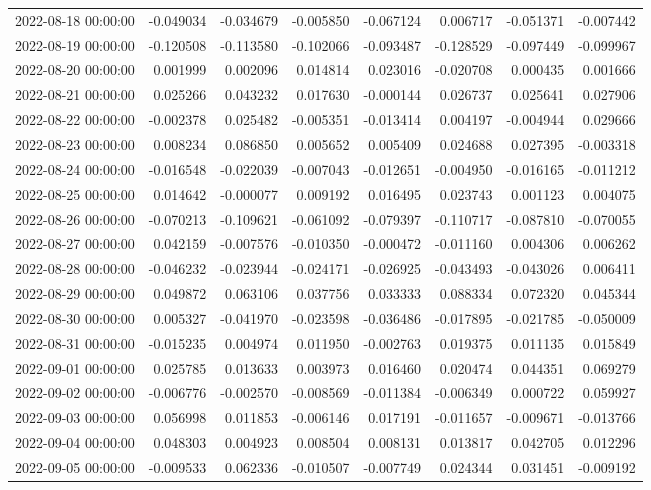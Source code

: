 \begin{tabular}{lrrrrrrr}
2022-08-18 00:00:00 & -0.049034 & -0.034679 & -0.005850 & -0.067124 & 0.006717 & -0.051371 & -0.007442 \\
2022-08-19 00:00:00 & -0.120508 & -0.113580 & -0.102066 & -0.093487 & -0.128529 & -0.097449 & -0.099967 \\
2022-08-20 00:00:00 & 0.001999 & 0.002096 & 0.014814 & 0.023016 & -0.020708 & 0.000435 & 0.001666 \\
2022-08-21 00:00:00 & 0.025266 & 0.043232 & 0.017630 & -0.000144 & 0.026737 & 0.025641 & 0.027906 \\
2022-08-22 00:00:00 & -0.002378 & 0.025482 & -0.005351 & -0.013414 & 0.004197 & -0.004944 & 0.029666 \\
2022-08-23 00:00:00 & 0.008234 & 0.086850 & 0.005652 & 0.005409 & 0.024688 & 0.027395 & -0.003318 \\
2022-08-24 00:00:00 & -0.016548 & -0.022039 & -0.007043 & -0.012651 & -0.004950 & -0.016165 & -0.011212 \\
2022-08-25 00:00:00 & 0.014642 & -0.000077 & 0.009192 & 0.016495 & 0.023743 & 0.001123 & 0.004075 \\
2022-08-26 00:00:00 & -0.070213 & -0.109621 & -0.061092 & -0.079397 & -0.110717 & -0.087810 & -0.070055 \\
2022-08-27 00:00:00 & 0.042159 & -0.007576 & -0.010350 & -0.000472 & -0.011160 & 0.004306 & 0.006262 \\
2022-08-28 00:00:00 & -0.046232 & -0.023944 & -0.024171 & -0.026925 & -0.043493 & -0.043026 & 0.006411 \\
2022-08-29 00:00:00 & 0.049872 & 0.063106 & 0.037756 & 0.033333 & 0.088334 & 0.072320 & 0.045344 \\
2022-08-30 00:00:00 & 0.005327 & -0.041970 & -0.023598 & -0.036486 & -0.017895 & -0.021785 & -0.050009 \\
2022-08-31 00:00:00 & -0.015235 & 0.004974 & 0.011950 & -0.002763 & 0.019375 & 0.011135 & 0.015849 \\
2022-09-01 00:00:00 & 0.025785 & 0.013633 & 0.003973 & 0.016460 & 0.020474 & 0.044351 & 0.069279 \\
2022-09-02 00:00:00 & -0.006776 & -0.002570 & -0.008569 & -0.011384 & -0.006349 & 0.000722 & 0.059927 \\
2022-09-03 00:00:00 & 0.056998 & 0.011853 & -0.006146 & 0.017191 & -0.011657 & -0.009671 & -0.013766 \\
2022-09-04 00:00:00 & 0.048303 & 0.004923 & 0.008504 & 0.008131 & 0.013817 & 0.042705 & 0.012296 \\
2022-09-05 00:00:00 & -0.009533 & 0.062336 & -0.010507 & -0.007749 & 0.024344 & 0.031451 & -0.009192 \\

\end{tabular}
